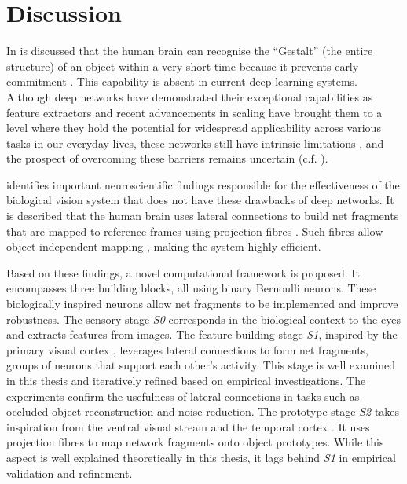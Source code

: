 \section{Discussion}
In  is discussed that the human brain can recognise the ``Gestalt'' (the entire structure) of an object within a very short time \cite{ellis_source_1938, kohler_gestalt_1992, wagemans_century_2012, hamlyn_psychology_2017} because it prevents early commitment \cite{marr_vision_2010}.
This capability is absent in current deep learning systems.
Although deep networks have demonstrated their exceptional capabilities as feature extractors and recent advancements in scaling have brought them to a level where they hold the potential for widespread applicability across various tasks in our everyday lives, these networks still have intrinsic limitations \cite{akhtar_threat_2018, long_survey_2022, madan_when_2022, marcus_deep_2018, smith_using_2022, garcia-martin_estimation_2019, kirkpatrick_overcoming_2017, rosenbloom_defining_2023, mitchell_debate_2023}, and the prospect of overcoming these barriers remains uncertain (c.f. ).

 identifies important neuroscientific findings responsible for the effectiveness of the biological vision system that does not have these drawbacks of deep networks.
It is described that the human brain uses lateral connections  to build net fragments  that are mapped to reference frames using projection fibres .
Such fibres allow object-independent mapping , making the system highly efficient.

Based on these findings, a novel computational framework is proposed.
It encompasses three building blocks, all using binary Bernoulli neurons.
These biologically inspired neurons allow net fragments to be implemented and improve robustness.
The sensory stage \emph{S0} corresponds in the biological context to the eyes and extracts features from images.
The feature building stage \emph{S1}, inspired by the primary visual cortex \cite{tong_primary_2003, grill-spector_human_2004}, leverages lateral connections to form net fragments, groups of neurons that support each other's activity.
This stage is well examined in this thesis and iteratively refined based on empirical investigations.
The experiments confirm the usefulness of lateral connections in tasks such as occluded object reconstruction and noise reduction.
The prototype stage \emph{S2} takes inspiration from the ventral visual stream \cite{goodale_separate_1992} and the temporal cortex \cite{miyashita_inferior_1993, conway_organization_2018}.
It uses projection fibres to map network fragments onto object prototypes. While this aspect is well explained theoretically in this thesis, it lags behind \emph{S1} in empirical validation and refinement.

